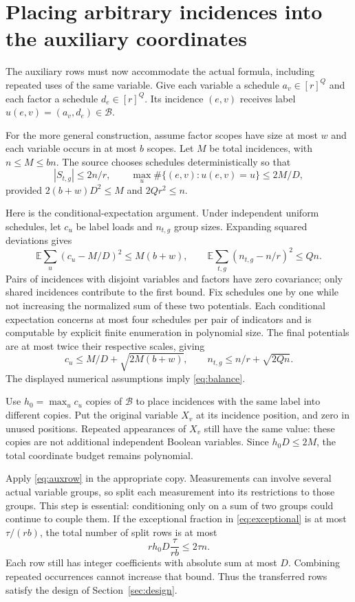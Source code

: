 \documentclass[11pt,a4paper]{article}
\numberwithin{equation}{section}
\theoremstyle{definition}
\theoremstyle{remark}
\begin{document}
\section{Placing arbitrary incidences into the auxiliary coordinates}
\label{sec:balance}
The auxiliary rows must now accommodate the actual formula, including repeated
uses of the same variable. Give each variable a schedule $a_v\in[r]^Q$ and
each factor a schedule $d_e\in[r]^Q$. Its incidence $(e,v)$ receives label
$u(e,v)=(a_v,d_e)\in\mathcal B$.

For the more general construction, assume factor scopes have size at most $w$
and each variable occurs in at most $b$ scopes. Let $M$ be total incidences,
with $n\le M\le bn$. The source chooses schedules deterministically so that
\begin{equation}\label{eq:balance}
 |S_{t,g}|\le2n/r,\qquad
 \max_u\#\{(e,v):u(e,v)=u\}\le2M/D,
\end{equation}
provided $2(b+w)D^2\le M$ and $2Qr^2\le n$.

Here is the conditional-expectation argument. Under independent uniform
schedules, let $c_u$ be label loads and $n_{t,g}$ group sizes. Expanding squared
deviations gives
\[
 \mathbb E\sum_u(c_u-M/D)^2\le M(b+w),\qquad
 \mathbb E\sum_{t,g}(n_{t,g}-n/r)^2\le Qn.
\]
Pairs of incidences with disjoint variables and factors have zero covariance;
only shared incidences contribute to the first bound. Fix schedules one by
one while not increasing the normalized sum of these two potentials. Each
conditional expectation concerns at most four schedules per pair of
indicators and is computable by explicit finite enumeration in polynomial
size. The final potentials are at most twice their respective scales, giving
\[
 c_u\le M/D+\sqrt{2M(b+w)},\qquad
 n_{t,g}\le n/r+\sqrt{2Qn}.
\]
The displayed numerical assumptions imply \eqref{eq:balance}.

Use $h_0=\max_uc_u$ copies of $\mathcal B$ to place incidences with the same
label into different copies. Put the original variable $X_v$ at its incidence
position, and zero in unused positions. Repeated appearances of $X_v$ still
have the same value: these copies are not additional independent Boolean
variables. Since $h_0D\le2M$, the total coordinate budget remains polynomial.

Apply \eqref{eq:auxrow} in the appropriate copy. Measurements can involve
several actual variable groups, so split each measurement into its restrictions
to those groups. This step is essential: conditioning only on a sum of two
groups could continue to couple them. If the exceptional fraction in
\eqref{eq:exceptional} is at most $\tau/(rb)$, the total number of split rows
is at most
\[
 rh_0D\frac{\tau}{rb}\le2\tau n.
\]
Each row still has integer coefficients with absolute sum at most $D$.
Combining repeated occurrences cannot increase that bound. Thus the transferred
rows satisfy the design of Section~\ref{sec:design}.
\end{document}
